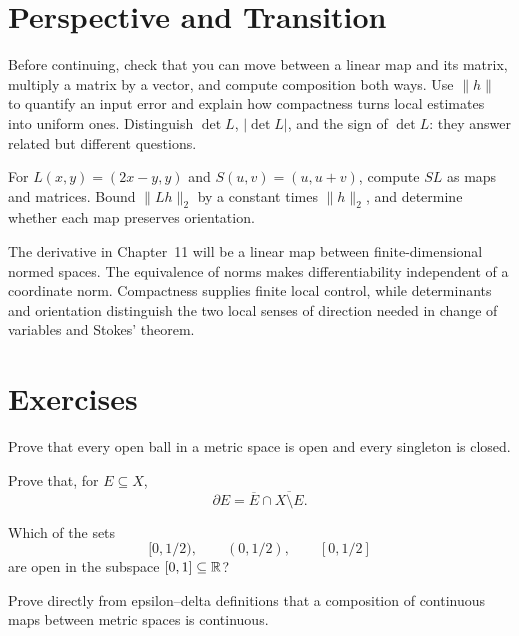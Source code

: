 \section{Perspective and Transition}
Before continuing, check that you can move between a linear map and its
matrix, multiply a matrix by a vector, and compute composition both ways.
Use $\|h\|$ to quantify an input error and explain how compactness turns
local estimates into uniform ones. Distinguish $\det L$, $|\det L|$, and
the sign of $\det L$: they answer related but different questions.
\begin{exercise}
For $L(x,y)=(2x-y,y)$ and $S(u,v)=(u,u+v)$, compute $SL$ as maps and
matrices. Bound $\|Lh\|_2$ by a constant times $\|h\|_2$, and determine
whether each map preserves orientation.
\end{exercise}



The derivative in Chapter~11 will be a linear map between finite-dimensional
normed spaces.  The equivalence of norms makes differentiability independent
of a coordinate norm.  Compactness supplies finite local control, while
determinants and orientation distinguish the two local senses of direction
needed in change of variables and Stokes' theorem.

\section*{Exercises}

\begin{exercise}
Prove that every open ball in a metric space is open and every singleton is
closed.
\end{exercise}

\begin{exercise}
Prove that, for $E\subseteq X$,
\[
\partial E=\overline E\cap\overline{X\setminus E}.
\]
\end{exercise}

\begin{exercise}
Which of the sets
\[
[0,1/2),\qquad (0,1/2),\qquad [0,1/2]
\]
are open in the subspace $[0,1]\subseteq\mathbb{R}$?
\end{exercise}

\begin{exercise}
Prove directly from epsilon--delta definitions that a composition of
continuous maps between metric spaces is continuous.
\end{exercise}

